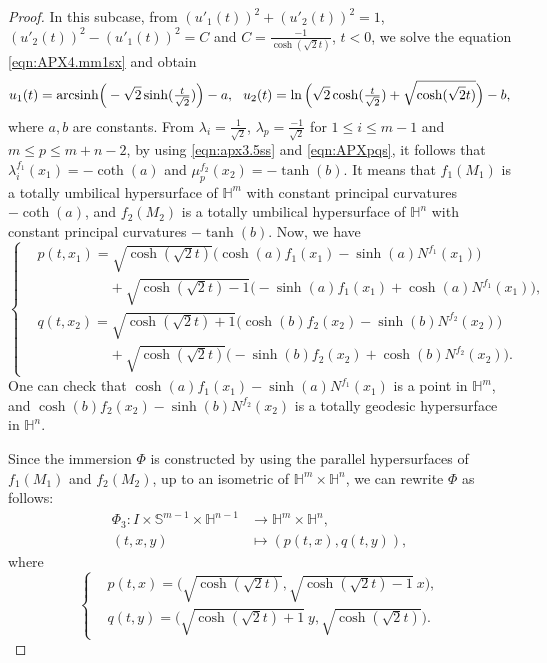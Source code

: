 \documentclass[reqno]{amsart}%
\theoremstyle{definition}
\numberwithin{equation}{section}
\begin{document}
\begin{proof}
In this subcase, from $(u'_{1}(t))^2+(u'_{2}(t))^2=1$, $(u'_{2}(t))^2-(u'_{1}(t))^2=C$ and $C=\frac{-1}{\cosh(\sqrt{2}t)}$, $t<0$, we solve the equation \eqref{eqn:APX4.mm1sx} and obtain 
\begin{equation}\label{eqn:APXpqs}
		u_1(t)={\rm arcsinh}\Big(-\sqrt{2}\sinh(\tfrac{t}{\sqrt{2}})\Big)-a, \ \ 
		u_2(t)=\ln\Big(\sqrt{2}\cosh(\tfrac{t}{\sqrt{2}})+\sqrt{\cosh(\sqrt{2}t)}\Big)-b,
\end{equation}
where $a,b$ are constants.  
From $\lambda_i=\frac{1}{\sqrt{2}}$, $\lambda_p=\frac{-1}{\sqrt{2}}$ for $1\leq i\leq m-1$ and $m\leq p\leq m+n-2$, by using \eqref{eqn:apx3.5ss} and \eqref{eqn:APXpqs}, it follows that 
$\lambda^{f_1}_i(x_1)=-\coth(a)$ and $\mu^{f_2}_p(x_2)=-\tanh(b)$. It means that 
$f_1(M_1)$ is a totally umbilical hypersurface of 
$\mathbb{H}^m$ with constant principal curvatures $-\coth(a)$, and $f_2(M_2)$ is a totally umbilical hypersurface of 
$\mathbb{H}^n$ with constant principal curvatures $-\tanh(b)$. 
Now, we have 
$$
\left\{
\begin{aligned}
	&p(t,x_1)=\sqrt{\cosh(\sqrt{2}t)}\big(\cosh(a)f_1(x_1)-\sinh(a)N^{f_1}(x_1)\big)\\
	&\ \ \ \ \ \ \ \ \ \ \ \ \ \ \ \ \ \ \ \ \ \ \
	+\sqrt{\cosh(\sqrt{2}t)-1}\big(-\sinh(a)f_1(x_1)+\cosh(a)N^{f_1}(x_1)\big),\\
	&q(t,x_2)=\sqrt{\cosh(\sqrt{2}t)+1}\big(\cosh(b)f_2(x_2)-\sinh(b)N^{f_2}(x_2)\big)\\
	&\ \ \ \ \ \ \ \ \ \ \ \ \ \ \ \ \ \ \ \ \ \ \
	+\sqrt{\cosh(\sqrt{2}t)}\big(-\sinh(b)f_2(x_2)+\cosh(b)N^{f_2}(x_2)\big).
\end{aligned}\right.
$$
One can check that $\cosh(a)f_1(x_1)-\sinh(a)N^{f_1}(x_1)$ is a point in $\mathbb{H}^{m}$, and $\cosh(b)f_2(x_2)-\sinh(b)N^{f_2}(x_2)$ is a totally geodesic hypersurface in $\mathbb{H}^{n}$. 



Since the immersion $\Phi$ is constructed by using the parallel hypersurfaces of $f_1(M_1)$ and $f_2(M_2)$, 
up to an isometric of $\mathbb{H}^m\times \mathbb{H}^n$, we can rewrite $\Phi$ as follows: 
\begin{equation}\label{eqn:ap3.1ssss}
	\begin{aligned}
		\Phi_3:I\times \mathbb{S}^{m-1}\times \mathbb{H}^{n-1}&\longrightarrow \mathbb{H}^m\times \mathbb{H}^n,\\
		(t,x,y)&\longmapsto (p(t,x),q(t,y)),
	\end{aligned}
\end{equation}
%
where
%
$$
\left\{\begin{aligned}
	&p(t,x)=\Big(\sqrt{\cosh(\sqrt{2}t)},\sqrt{\cosh(\sqrt{2}t)-1}\ x\Big),\\
	&q(t,y)=\Big(\sqrt{\cosh(\sqrt{2}t)+1}\ y,\sqrt{\cosh(\sqrt{2}t)}\Big).
\end{aligned}\right.
$$


\end{proof}
\end{document}
